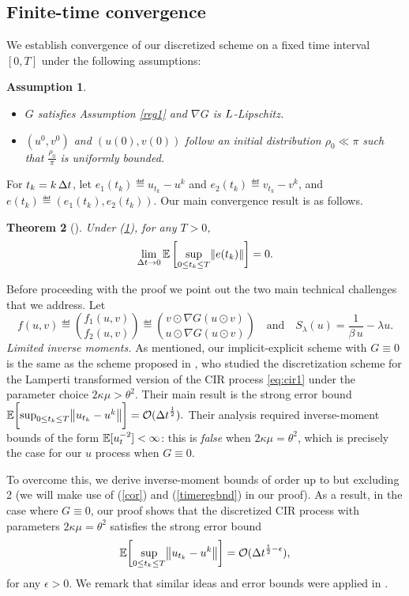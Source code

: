 \documentclass[11pt, twoside]{report}
\newtheorem{theorem}{Theorem}[section]
\newtheorem{assumption}[theorem]{Assumption}
\begin{document}
\subsection{Finite-time convergence}
We  establish convergence  of our discretized scheme on a fixed time interval $[0,T]$ under the following assumptions:
\begin{assumption}\label{reg3} 
\begin{itemize}
    \item[(i)] $G$ satisfies Assumption \ref{reg1} and $\nabla G$ is $L$-Lipschitz.
    \item[(ii)] $(u^0,v^0)$ and $(u(0),v(0))$ follow an initial distribution $\rho_0\ll \pi $ such that $\frac{\rho_0}{\pi}$ is uniformly bounded.
\end{itemize}
\end{assumption}
For $t_k=k\,{\Delta t}$, let  $e_1(t_k) \eqdef u_{t_k} - u^k$ and $e_2(t_k) \eqdef v_{t_k} - v^k$, and $e(t_k) \eqdef (e_1(t_k), e_2(t_k)) $. Our main convergence result is as follows.
\begin{theorem}[\texorpdfstring{\cite[Theorem~4.3]{2025hadalangsamp}}{}]\label{thm:num_conv}
Under (\ref{reg3}), for any $T>0$,
$$
\lim_{\deltat \to 0} \EE\left[\sup_{0\leq t_k \leq T} \norm{e(t_k)}\right] = 0.
$$
\end{theorem}
Before proceeding with the proof we point out the two main technical challenges that we address. Let 
\begin{equation}\label{eq:f}
    f(u,v) \eqdef \binom{f_1(u,v)}{f_2(u,v)} \eqdef \binom{v\odot \nabla G(u\odot v)}{u\odot \nabla G(u\odot v)}
    \quad \text{and}\quad
    S_\lambda(u) = \frac{1}{\beta\, u} - \lambda u.
\end{equation}
\textit{Limited inverse moments.} As mentioned, our implicit-explicit scheme with $G\equiv 0$ is  the same as the scheme proposed in \cite{Dereich2011-tp}, who studied the discretization scheme for the Lamperti transformed version of the CIR process \eqref{eq:cir1} under the parameter choice $2\kappa\mu>\theta^2$. Their main result is the strong error bound $\EE\biggl[\sup_{0\leq t_k \leq T} \norm{ u_{t_k} - u^k}\biggr] = \Oo(\deltat^{\frac12}).$ Their analysis required inverse-moment bounds of the form $\mathbb{E}[u_t^{-2}]<\infty$: this is \textit{false} when $2\kappa\mu = \theta^2$, which is precisely the case for our $u$ process when $G\equiv 0$. 

To overcome this, we derive inverse-moment bounds of order up to but excluding 2 (we will make use of (\ref{cor}) and (\ref{timeregbnd}) in our proof). As a result, in the case where $G\equiv 0$, our proof shows that the discretized CIR process with parameters $2\kappa\mu =\theta^2$  satisfies the strong error bound $$\EE\biggl[\sup_{0\leq t_k \leq T} \norm{ u_{t_k} - u^k}\biggr] = \Oo(\deltat^{\frac12-\epsilon}),$$  for any $\epsilon>0$. We remark that similar ideas and error bounds were applied in \cite{hutzenthaler2014strong}.
\end{document}
